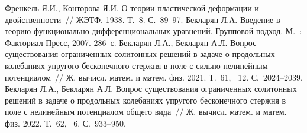 \begin{thebibliography}{9} %
 Френкель Я.И., Конторова Я.И. О теории пластической деформации и двойственности~// ЖЭТФ.  1938.  Т.~8.  С.~89--97.
 Бекларян Л.А. Введение в теорию функ\-ци\-о\-наль\-но-диф\-фе\-рен\-ци\-о\-наль\-ных уравнений. Групповой подход.  М.~: Факториал Пресс, 2007.  286~с.
 Бекларян Л.А., Бекларян А.Л.  Вопрос существования ограниченных солитонных решений в задаче о продольных колебаниях упругого бесконечного стержня в поле с сильно нелинейным потенциалом~// Ж. вычисл. матем. и матем. физ. 2021. Т.~61, \textnumero~12. С.~2024--2039.
 Бекларян Л.А., Бекларян А.Л. Вопрос существования ограниченных солитонных решений в задаче о продольных колебаниях упругого бесконечного стержня в поле с нелинейным потенциалом общего вида~// Ж. вычисл. матем. и матем. физ.  2022.  Т.~62, \textnumero~6. С.~933--950.
\end{thebibliography}





%
